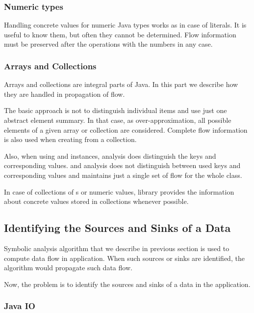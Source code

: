 \subsubsection{Numeric types}

Handling concrete values for numeric Java types works as in case
of  literals. It is useful to know them, but often
they cannot be determined. Flow information must be preserved after
the operations with the numbers in any case.




\subsubsection{Arrays and Collections}

Arrays and collections are integral parts of Java. In this part we describe how
they are handled in propagation of flow.

The basic approach is not to distinguish individual items and use just one
abstract element summary. In that case, as over-approximation, all possible elements
of a given array or collection are considered.
Complete flow information is also used when creating 
from a collection.

Also, when using  and  instances,
analysis does distinguish the keys and corresponding values.
and 
analysis does not distinguish between used keys and corresponding values
and maintains just a single set of flow for the whole class.

In case of collections of s or numeric values, library provides
the information about concrete values stored in collections whenever possible.





\subsection{Identifying the Sources and Sinks of a Data}

Symbolic analysis algorithm that we describe in previous section is
used to compute data flow in application.
When such sources or sinks are identified, the algorithm would
propagate such data flow.

Now, the problem is to identify the sources and sinks of a data
in the application.




\subsubsection{Java IO}

